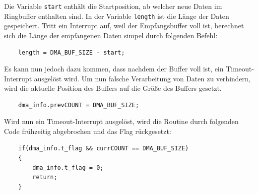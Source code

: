   Die Variable \lstinline!start! enthält die Startposition, ab welcher neue Daten im Ringbuffer enthalten sind. In der Variable \lstinline!length!
  ist die Länge der Daten gespeichert. Tritt ein Interrupt auf, weil der Empfangsbuffer voll ist, berechnet sich die Länge der empfangenen 
  Daten simpel durch folgenden Befehl:
  \begin{lstlisting}
    length = DMA_BUF_SIZE - start;
  \end{lstlisting}
  Es kann nun jedoch dazu kommen, dass nachdem der Buffer voll ist, ein Timeout-Interrupt ausgelöst wird. Um nun falsche Verarbeitung von 
  Daten zu verhindern, wird die aktuelle Position des Buffers auf die Größe des Buffers gesetzt.
  \begin{lstlisting}
    dma_info.prevCOUNT = DMA_BUF_SIZE;      
  \end{lstlisting}
  Wird nun ein Timeout-Interrupt ausgelöst, wird die Routine durch folgenden Code frühzeitig abgebrochen und das Flag rückgesetzt:
  \begin{lstlisting}
    if(dma_info.t_flag && currCOUNT == DMA_BUF_SIZE)
    {
        dma_info.t_flag = 0;
        return;
    }
  \end{lstlisting}